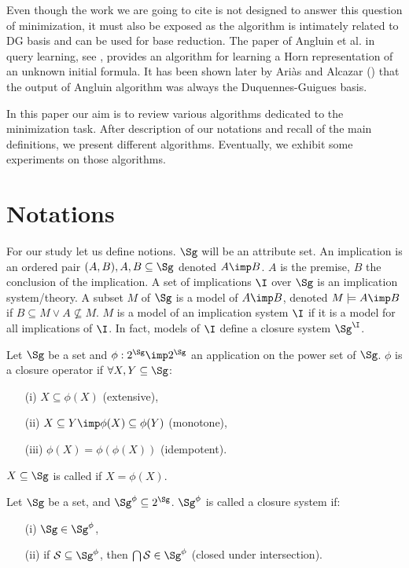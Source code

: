 \documentclass[a4paper, 10pt]{article}
\begin{document}
Even though the work we are going to cite is not designed to answer this 
question of minimization, it must also be exposed as the algorithm is 
intimately related to DG basis and can be used for base reduction. The paper
of Angluin et al. in query learning, see \cite{angluin_learning_1992}, provides
an algorithm for learning a Horn representation of an unknown initial formula. 
It has been shown later by Ariàs and Alcazar (\cite{arias_canonical_2009}) that
the output of Angluin algorithm was always the Duquennes-Guigues basis.

In this paper our aim is to review various algorithms dedicated to the minimization task. After description of our notations and recall of the main definitions, we present different algorithms. Eventually, we exhibit some experiments on those algorithms.

\section{Notations}

For our study let us define notions. $\Sg$ will be an attribute set. An implication is an ordered pair $(A, B), A, B \subseteq \Sg$ denoted $A \imp B$.
$A$ is the premise, $B$ the conclusion of the implication. A set of implications
$\I$ over $\Sg$ is an implication system/theory. A subset $M$ of $\Sg$ is a model of $A \imp B$, denoted $M \models A \imp B$ if $B \subseteq M \lor A \nsubseteq M$. $M$ is a model of an implication system $\I$ if it is a model for
all implications of $\I$. In fact, models of $\I$ define a closure system $\Sg^{\I}$. 

\begin{definition} Let $\Sg$ be a set and $\phi : 
	2^{\Sg} \imp 2^{\Sg}$ an application on the power set of $\Sg$. $\phi$ is
	a closure operator if $\forall X, Y \subseteq \Sg$:
	\begin{itemize}
		\item[(i)] $X \subseteq \phi(X)$ (extensive),
		\item[(ii)] $X \subseteq Y \imp \phi(X) \subseteq \phi(Y)$
		(monotone),
		\item[(iii)] $\phi(X) = \phi(\phi(X))$ (idempotent).
	\end{itemize}
	$X \subseteq \Sg$ is called  if $X = \phi(X)$.
\end{definition}

\begin{definition} Let $\Sg$ be a set, and $\Sg^{\phi}
	\subseteq 2^{\Sg}$. $\Sg^{\phi}$ is called a closure system if:
	\begin{itemize}
		\item[(i)] $\Sg \in \Sg^{\phi}$,
		\item[(ii)] if $\cal{S} \subseteq \Sg^{\phi}$, then $\bigcap \cal{S} 
		\in \Sg^{\phi}$ \quad (closed under intersection).
	\end{itemize}
	
\end{definition}
\end{document}
